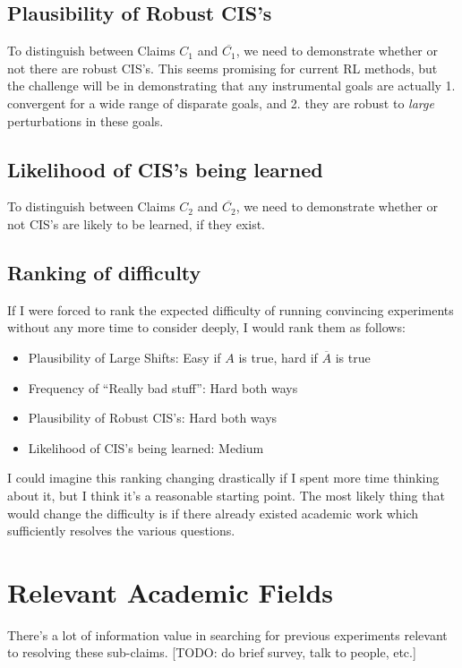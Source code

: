 \documentclass{article}
\begin{document}
\subsection{Plausibility of Robust CIS's}
To distinguish between Claims $C_1$ and $\overline{C_1}$, we need to demonstrate whether or not there are robust CIS's. This seems promising for current RL methods, but the challenge will be in demonstrating that any instrumental goals are actually 1. convergent for a wide range of disparate goals, and 2. they are robust to \emph{large} perturbations in these goals.

\subsection{Likelihood of CIS's being learned}
To distinguish between Claims $C_2$ and $\overline{C_2}$, we need to demonstrate whether or not CIS's are likely to be learned, if they exist.

\subsection{Ranking of difficulty}
If I were forced to rank the expected difficulty of running convincing experiments without any more time to consider deeply, I would rank them as follows:
\begin{itemize}
    \item Plausibility of Large Shifts: Easy if $A$ is true, hard if $\overline{A}$ is true
    \item Frequency of ``Really bad stuff”: Hard both ways
    \item Plausibility of Robust CIS's: Hard both ways
    \item Likelihood of CIS's being learned: Medium
\end{itemize}
I could imagine this ranking changing drastically if I spent more time thinking about it, but I think it’s a reasonable starting point. The most likely thing that would change the difficulty is if there already existed academic work which sufficiently resolves the various questions. 

\section{Relevant Academic Fields}
There's a lot of information value in searching for previous experiments relevant to resolving these sub-claims. [TODO: do brief survey, talk to people, etc.]

\end{document}
